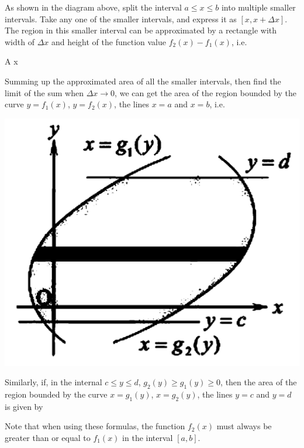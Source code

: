 As shown in the diagram above, split the interval $a \leq x \leq b$ into
multiple smaller intervals. Take any one of the smaller intervals, and express
it as $[x, x + \Delta x]$. The region in this smaller interval can be
approximated by a rectangle with width of $\Delta x$ and height of the function
value $f_2(x) - f_1(x)$, i.e.
\begin{cequation}
    \Delta A \approx [f_2(x) - f_1(x)]\Delta x
\end{cequation}

Summing up the approximated area of all the smaller intervals, then find the
limit of the sum when $\Delta x \to 0$, we can get the area of the region
bounded by the curve $y = f_1(x)$, $y = f_2(x)$, the lines $x = a$ and $x = b$,
i.e.
\begin{center}
\end{center}

\begin{center}
    \includegraphics[scale=0.15]{assets/28-17.png}
\end{center}

Similarly, if, in the internal $c \leq y \leq d$, $g_2(y) \geq g_1(y) \geq 0$,
then the area of the region bounded by the curve $x = g_1(y)$, $x = g_2(y)$,
the lines $y = c$ and $y = d$ is given by
\begin{center}
\end{center}
Note that when using these formulas, the function $f_2(x)$ must always be greater than or equal to $f_1(x)$ in the interval $[a, b]$.

